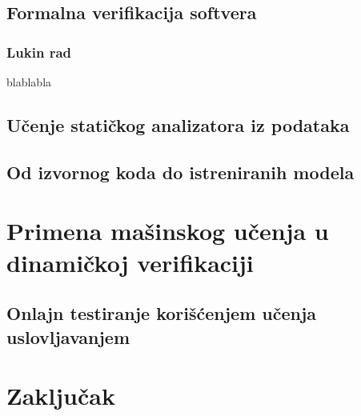 \documentclass[11pt]{beamer}
\theoremstyle{definition}
\begin{document}
\subsection{Formalna verifikacija softvera}
\label{subsec:formalna-verifikacija}
\begin{frame}
\frametitle{Lukin rad}
blablabla
\end{frame}


\subsection{Učenje statičkog analizatora iz podataka}
\label{subsec:staticki-analizator}

\subsection{Od izvornog koda do istreniranih modela}
\label{subsec:pregled}

\section{Primena mašinskog učenja u dinamičkoj verifikaciji}
\label{sec:dinamcikaPrimena}

\subsection{Onlajn testiranje korišćenjem učenja uslovljavanjem }

\section{Zaključak}
\label{sec:zakljucak}
\end{document}
